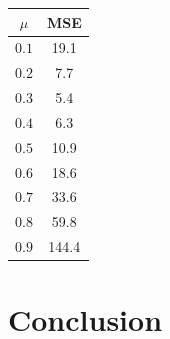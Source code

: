 \documentclass[11pt]{article}
\begin{document}
\begin{center}
\begin{tabular}{| c | c |}
  \hline $\mu$ & MSE \\
  \hline $0.1$ & 19.1\\
  $0.2$ & 7.7\\
  $0.3$ & 5.4\\
  $0.4$ & 6.3\\
  $0.5$ & 10.9\\
  $0.6$ & 18.6\\
  $0.7$ & 33.6\\
  $0.8$ & 59.8\\
  $0.9$ & 144.4\\
  \hline
\end{tabular}
\end{center}

\section{Conclusion}





\end{document}
